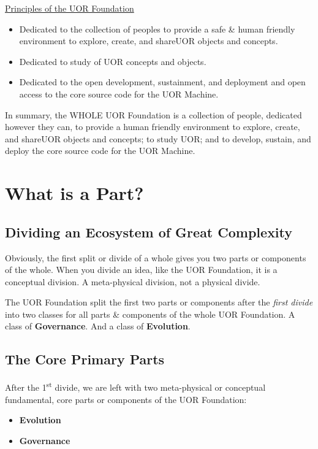 \documentclass[twocolumn,10pt]{article}
\begin{document}
\vspace{20pt}
\begin{minipage}{0.95\linewidth}
    \begin{tcolorbox}
    \begin{center}\underline{Principles of the UOR Foundation}\end{center}
        \begin{itemize}
            \item Dedicated to the collection of peoples to provide a safe \& human friendly environment to explore, create, and share\@ UOR objects and concepts. 
            \item Dedicated to study of UOR concepts and objects.
            \item Dedicated to the open development, sustainment, and deployment and open access to the core source code for the UOR Machine\@.
        \end{itemize}
    \end{tcolorbox}
\end{minipage}
\vspace{10pt}

In summary, the WHOLE UOR Foundation is a collection of people, dedicated however they can, to provide a human friendly environment to explore, create, and share\@ UOR objects and concepts; to study UOR\@; and to develop, sustain, and deploy the core source code for the UOR Machine\@.

\section*{What is a Part?}
\subsection*{Dividing an Ecosystem of Great Complexity}
Obviously, the first split or divide of a whole gives you two parts or components of the whole.
When you divide an idea, like the UOR Foundation, it is a conceptual division.
A meta-physical division, not a physical divide.

The UOR Foundation split the first two parts or components after the \textit{first divide} into two classes for all parts \& components of the whole UOR Foundation.
A class of \textbf{Governance}.
And a class of \textbf{Evolution}.

\subsection*{The Core Primary Parts}
After the 1\textsuperscript{st} divide, we are left with two meta-physical or conceptual fundamental, core parts or components of the UOR Foundation:
    \begin{itemize}
        \item \textbf{Evolution} 
        \item \textbf{Governance}
    \end{itemize}
\end{document}
